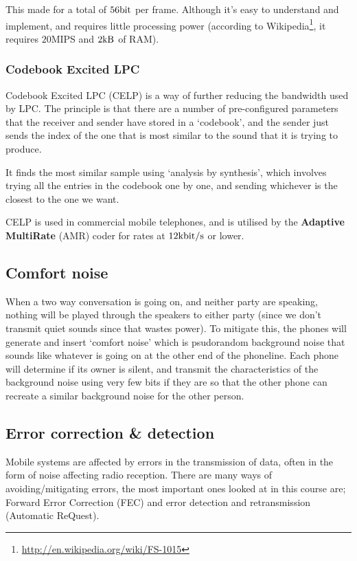 
This made for a total of $56\si{\bit}$ per frame. Although it's easy to
understand and implement, and requires little processing power (according to
Wikipedia\footnote{\url{http://en.wikipedia.org/wiki/FS-1015}}, it requires
$20$MIPS and $2\si{\kilo\byte}$ of RAM).

\subsubsection{Codebook Excited LPC}

Codebook Excited LPC (CELP) is a way of further reducing the bandwidth used by
LPC. The principle is that there are a number of pre-configured parameters that
the receiver and sender have stored in a `codebook', and the sender just sends
the index of the one that is most similar to the sound that it is trying to
produce.

It finds the most similar sample using `analysis by synthesis', which involves
trying all the entries in the codebook one by one, and sending whichever is the
closest to the one we want. 

CELP is used in commercial mobile telephones, and is utilised by the
\textbf{Adaptive MultiRate} (AMR) coder for rates at
$12\si{\kilo\bit\per\second}$ or lower.

\subsection{Comfort noise}

When a two way conversation is going on, and neither party are speaking, nothing
will be played through the speakers to either party (since we don't transmit
quiet sounds since that wastes power). To mitigate this, the phones will
generate and insert `comfort noise' which is psudorandom background noise that
sounds like whatever is going on at the other end of the phoneline. Each phone
will determine if its owner is silent, and transmit the characteristics of the
background noise using very few bits if they are so that the other phone can
recreate a similar background noise for the other person.

\subsection{Error correction \& detection}

Mobile systems are affected by errors in the transmission of data, often in the
form of noise affecting radio reception. There are many ways of
avoiding/mitigating errors, the most important ones looked at in this course
are; Forward Error Correction (FEC) and error detection and retransmission
(Automatic ReQuest).

